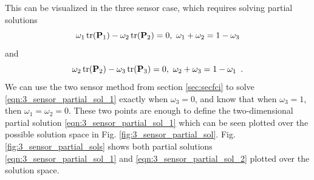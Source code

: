 \documentclass[letterpaper, 10 pt, journal, twoside]{ieeetran}  %
\begin{document}
This can be visualized in the three sensor case, which requires solving partial solutions
\begin{equation}
   \omega_1 \operatorname{tr}({{\mathbf{P}}}_1) - \omega_2 \operatorname{tr}({{\mathbf{P}}}_2) = 0,\ \omega_1+\omega_2=1-\omega_3 \label{eqn:3_sensor_partial_sol_1}
\end{equation}
and
\begin{equation}
   \omega_2 \tr(\mP_2) - \omega_3 \tr(\mP_3) = 0,\ \omega_2+\omega_3=1-\omega_1\enspace. \label{eqn:3_sensor_partial_sol_2}
\end{equation}
We can use the two sensor method from section \ref{sec:secfci} to solve \eqref{eqn:3_sensor_partial_sol_1} exactly when $\omega_3=0$, and know that when $\omega_3=1$, then $\omega_1=\omega_2=0$. These two points are enough to define the two-dimensional partial solution \eqref{eqn:3_sensor_partial_sol_1} which can be seen plotted over the possible solution space in Fig. \ref{fig:3_sensor_partial_sol}. Fig. \ref{fig:3_sensor_partial_sols} shows both partial solutions \eqref{eqn:3_sensor_partial_sol_1} and \eqref{eqn:3_sensor_partial_sol_2} plotted over the solution space.
\end{document}
